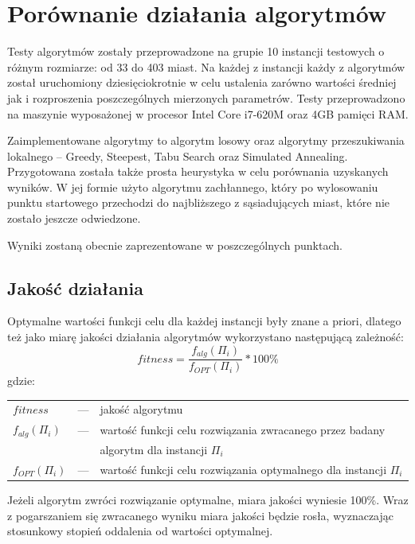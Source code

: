 \section{Porównanie działania algorytmów}
Testy algorytmów zostały przeprowadzone na grupie 10 instancji testowych o różnym rozmiarze: od 33 do 403 miast. Na każdej z instancji każdy z algorytmów został uruchomiony dziesięciokrotnie w celu ustalenia zarówno wartości średniej jak i rozproszenia poszczególnych mierzonych parametrów. Testy przeprowadzono na maszynie wyposażonej w procesor Intel Core i7-620M oraz 4GB pamięci RAM. 

Zaimplementowane algorytmy to algorytm losowy oraz algorytmy przeszukiwania lokalnego -- Greedy, Steepest, Tabu Search oraz Simulated Annealing. Przygotowana została także prosta heurystyka w celu porównania uzyskanych wyników. W jej formie użyto algorytmu zachłannego, który po wylosowaniu punktu startowego przechodzi do najbliższego z sąsiadujących miast, które nie zostało jeszcze odwiedzone.

Wyniki zostaną obecnie zaprezentowane w poszczególnych punktach.

\subsection{Jakość działania}
Optymalne wartości funkcji celu dla każdej instancji były znane a priori, dlatego też jako miarę jakości działania algorytmów wykorzystano następującą zależność:
\begin{equation*}
fitness = \frac{f_{alg}(\Pi_i)}{f_{OPT}(\Pi_i)}*100\%
\end{equation*}
gdzie:

\begin{table}[h!]
       \begin{tabular}{lll}
       	$fitness$ & --- & jakość algorytmu\\ 
        $f_{alg}(\Pi_{i})$ & --- & wartość funkcji celu rozwiązania zwracanego przez badany \\
        &&algorytm dla instancji $\Pi_i$\\ 
		$f_{OPT}(\Pi_{i})$ & --- & wartość funkcji celu rozwiązania optymalnego dla instancji $\Pi_i$
		\end{tabular}
\end{table}
\noindent Jeżeli algorytm zwróci rozwiązanie optymalne, miara jakości wyniesie 100\%. Wraz z pogarszaniem się zwracanego wyniku miara jakości będzie rosła, wyznaczając stosunkowy stopień oddalenia od wartości optymalnej.

